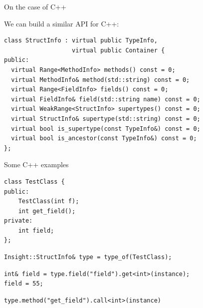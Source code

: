 \documentclass[10pt]{beamer}
\begin{document}

\begin{frame}[fragile]{On the case of C++}

  We can build a similar API for C++:

  \begin{lstlisting}
class StructInfo : virtual public TypeInfo,
                   virtual public Container {
public:
  virtual Range<MethodInfo> methods() const = 0;
  virtual MethodInfo& method(std::string) const = 0;
  virtual Range<FieldInfo> fields() const = 0;
  virtual FieldInfo& field(std::string name) const = 0;
  virtual WeakRange<StructInfo> supertypes() const = 0;
  virtual StructInfo& supertype(std::string) const = 0;
  virtual bool is_supertype(const TypeInfo&) const = 0;
  virtual bool is_ancestor(const TypeInfo&) const = 0;
};
  \end{lstlisting}

\end{frame}

\begin{frame}[fragile]{Some C++ examples}

  \begin{lstlisting}
class TestClass {
public:
    TestClass(int f);
    int get_field();
private:
    int field;
};
  \end{lstlisting}

  \pause{}

  \begin{lstlisting}
Insight::StructInfo& type = type_of(TestClass);
  \end{lstlisting}

  \pause{}

  \begin{lstlisting}
int& field = type.field("field").get<int>(instance);
field = 55;
  \end{lstlisting}

  \begin{lstlisting}
type.method("get_field").call<int>(instance)
  \end{lstlisting}

\end{frame}
\end{document}
